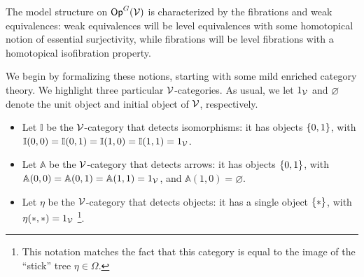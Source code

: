 \documentclass[a4paper,10pt
,draft
]{article}%
\renewcommand{\F}{\mathcal F}
\newcommand{\I}{\mathbb I}
\renewcommand{\1}{\eta}%
\begin{document}




The model structure on $\mathsf{Op}^G(\mathcal V)$ is characterized by the fibrations and weak equivalences:
weak equivalences will be level equivalences with some homotopical notion of essential surjectivity,
while fibrations will be level fibrations with a homotopical isofibration property.

We begin by formalizing these notions, starting with some mild enriched category theory.
We highlight three particular $\mathcal V$-categories.
As usual, we let $1_{\mathcal V}$ and $\varnothing$ denote the unit object and initial object of $\mathcal V$, respectively.
\begin{itemize} %
\item Let $\I$ be the $\mathcal V$-category that detects isomorphisms: it has objects $\left\{0,1\right\}$,
      with $\I(0,0) = \I(0,1) = \I(1,0) = \I(1,1) = 1_\V$.
\item Let $\mathbb A$ be the $\mathcal V$-category that detects arrows: it has objects $\left\{0,1\right\}$,
      with $\mathbb A(0,0) = \mathbb A(0,1) = \mathbb A(1,1) = 1_{\mathcal V}$, and $\mathbb A(1,0) = \varnothing$.
\item Let $\1$ be the $\mathcal V$-category that detects objects: it has a single object $\set{\**}$, with $\1(\**, \**) = 1_\V$
      \footnote{
        This notation matches the fact that this category is equal to the image of the ``stick'' tree $\eta \in \Omega$.}.
\end{itemize}
\end{document}
